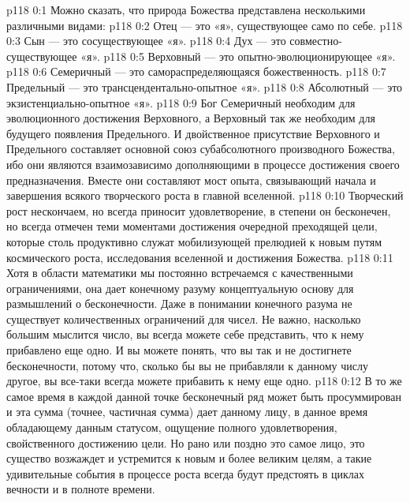 \author{Могучий Вестник}
\vs p118 0:1 Можно сказать, что природа Божества представлена несколькими различными видами:
\vs p118 0:2 \bibnobreakspace Отец --- это «я», существующее само по себе.
\vs p118 0:3 \bibnobreakspace Сын --- это сосуществующее «я».
\vs p118 0:4 \bibnobreakspace Дух --- это совместно\hyp{}существующее «я».
\vs p118 0:5 \bibnobreakspace Верховный --- это опытно\hyp{}эволюционирующее «я».
\vs p118 0:6 \bibnobreakspace Семеричный --- это самораспределяющаяся божественность.
\vs p118 0:7 \bibnobreakspace Предельный --- это трансцендентально\hyp{}опытное «я».
\vs p118 0:8 \bibnobreakspace Абсолютный --- это экзистенциально\hyp{}опытное «я».
\vs p118 0:9 \pc Бог Семеричный необходим для эволюционного достижения Верховного, а Верховный так же необходим для будущего появления Предельного. И двойственное присутствие Верховного и Предельного составляет основной союз субабсолютного производного Божества, ибо они являются взаимозависимо дополняющими в процессе достижения своего предназначения. Вместе они составляют мост опыта, связывающий начала и завершения всякого творческого роста в главной вселенной.
\vs p118 0:10 \pc Творческий рост нескончаем, но всегда приносит удовлетворение, в степени он бесконечен, но всегда отмечен теми моментами достижения очередной преходящей цели, которые столь продуктивно служат мобилизующей прелюдией к новым путям космического роста, исследования вселенной и достижения Божества.
\vs p118 0:11 Хотя в области математики мы постоянно встречаемся с качественными ограничениями, она дает конечному разуму концептуальную основу для размышлений о бесконечности. Даже в понимании конечного разума не существует количественных ограничений для чисел. Не важно, насколько большим мыслится число, вы всегда можете себе представить, что к нему прибавлено еще одно. И вы можете понять, что вы так и не достигнете бесконечности, потому что, сколько бы вы не прибавляли к данному числу другое, вы все\hyp{}таки всегда можете прибавить к нему еще одно.
\vs p118 0:12 В то же самое время в каждой данной точке бесконечный ряд может быть просуммирован и эта сумма (точнее, частичная сумма) дает данному лицу, в данное время обладающему данным статусом, ощущение полного удовлетворения, свойственного достижению цели. Но рано или поздно это самое лицо, это существо возжаждет и устремится к новым и более великим целям, а такие удивительные события в процессе роста всегда будут предстоять в циклах вечности и в полноте времени.
